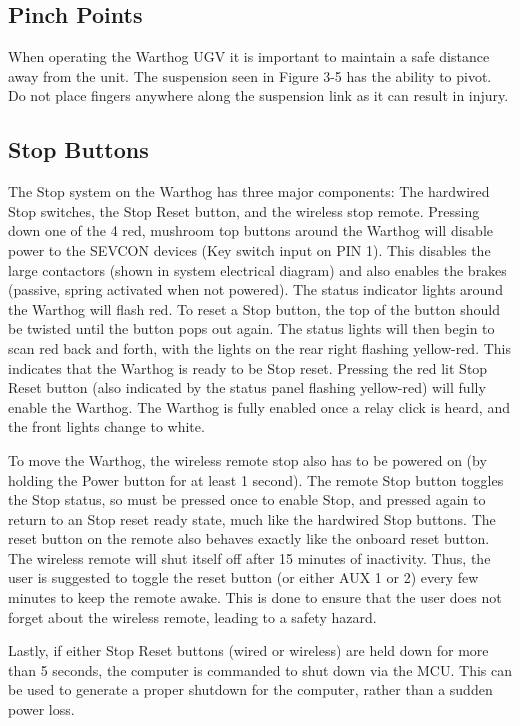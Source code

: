 \documentclass[]{clearpath-latex/clearpath-manual}
\begin{document}
\subsection{Pinch Points}

When operating the Warthog UGV it is important to maintain a safe distance away from the unit. The suspension seen in Figure 3-5 has the ability to pivot.  Do not place fingers anywhere along the suspension link as it can result in injury.

\subsection{Stop Buttons}

The Stop system on the Warthog has three major components: The hardwired Stop switches, the Stop Reset button, and the wireless stop remote. Pressing down one of the 4 red, mushroom top buttons around the Warthog will disable power to the SEVCON devices (Key switch input on PIN 1). This disables the large contactors (shown in system electrical diagram) and also enables the brakes (passive, spring activated when not powered). The status indicator lights around the Warthog will flash red. To reset a Stop button, the top of the button should be twisted until the button pops out again. The status lights will then begin to scan red back and forth, with the lights on the rear right flashing yellow-red. This indicates that the Warthog is ready to be Stop reset. Pressing the red lit Stop Reset button (also indicated by the status panel flashing yellow-red) will fully enable the Warthog. The Warthog is fully enabled once a relay click is heard, and the front lights change to white.

To move the Warthog, the wireless remote stop also has to be powered on (by holding the Power button for at least 1 second). The remote Stop button toggles the Stop status, so must be pressed once to enable Stop, and pressed again to return to an Stop reset ready state, much like the hardwired Stop buttons. The reset button on the remote also behaves exactly like the onboard reset button. The wireless remote will shut itself off after 15 minutes of inactivity. Thus, the user is suggested to toggle the reset button (or either AUX 1 or 2) every few minutes to keep the remote awake. This is done to ensure that the user does not forget about the wireless remote, leading to a safety hazard.

Lastly, if either Stop Reset buttons (wired or wireless) are held down for more than 5 seconds, the computer is commanded to shut down via the MCU. This can be used to generate a proper shutdown for the computer, rather than a sudden power loss.
\end{document}
